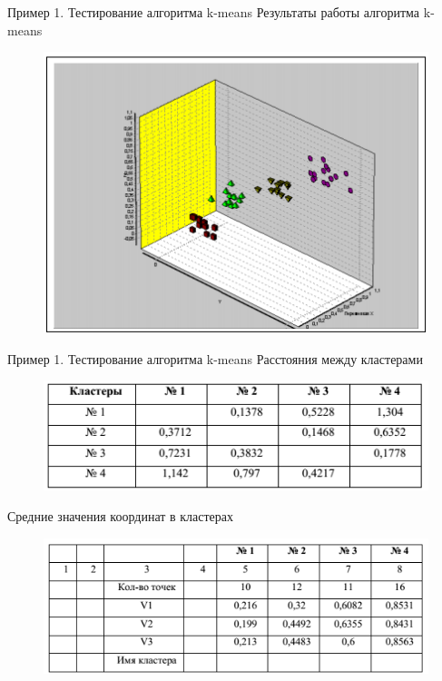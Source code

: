 \documentclass{beamer}
\begin{document}
\begin{frame}{Пример 1. Тестирование алгоритма k-means}
Результаты работы алгоритма k-means
\begin{figure}[h]
\centering
\includegraphics[scale=0.7]{images/lec07-pic37.png}
\end{figure}
\end{frame}

\begin{frame}{Пример 1. Тестирование алгоритма k-means}
Расстояния между кластерами
\begin{figure}[h]
\centering
\includegraphics[scale=0.5]{images/lec07-pic38.png}
\end{figure}
Средние значения координат в кластерах
\begin{figure}[h]
\centering
\includegraphics[scale=0.5]{images/lec07-pic39.png}
\end{figure}
\end{frame}
\end{document}

